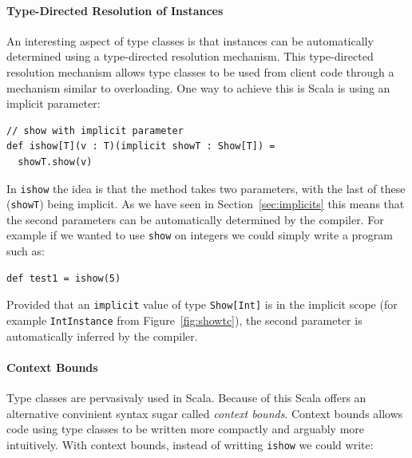 \documentclass[preprint]{sigplanconf}
\begin{document}


\paragraph{Type-Directed Resolution of Instances} An interesting
aspect of type classes is that instances can be automatically
determined using a type-directed resolution mechanism. This
type-directed resolution mechanism allows type classes
to be used from client code through a mechanism similar to
overloading. One way to achieve this is Scala is using an implicit
parameter:

\begin{lstlisting}
// show with implicit parameter
def ishow[T](v : T)(implicit showT : Show[T]) =
  showT.show(v)
\end{lstlisting}

In \lstinline{ishow} the idea is that the method takes two parameters,
with the last of these (\lstinline{showT}) being implicit. As we have
seen in Section~\ref{sec:implicits} this means that the second
parameters can be automatically determined by the compiler.  For
example if we wanted to use \lstinline{show} on integers we could
simply write a program such as:

\begin{lstlisting}
def test1 = ishow(5)
\end{lstlisting}

Provided that an \lstinline{implicit} value of type
\lstinline{Show[Int]} is in the implicit scope (for example
\lstinline{IntInstance} from Figure~\ref{fig:showtc}), the second
parameter is automatically inferred by the compiler.

\paragraph{Context Bounds} Type classes are pervasivaly used in
Scala. Because of this Scala offers an alternative convinient syntax sugar called
\emph{context bounds}. Context bounds allows code using type classes to be
written more compactly and arguably more intuitively. With context
bounds, instead of writting \lstinline{ishow} we could write:
\end{document}
